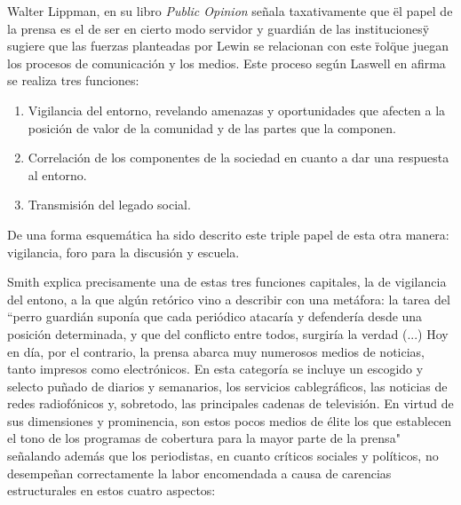
Walter Lippman, en su libro \emph{Public Opinion} \cite{lippmann1922public} señala taxativamente que \"el papel de la prensa es el de ser en cierto modo servidor y guardián de las instituciones\" y sugiere que las fuerzas planteadas por Lewin se relacionan con este \"rol\" que juegan los procesos de comunicación y los medios. Este proceso según Laswell en \cite{Lasswell2007Structure} afirma se realiza tres funciones: 
\begin{enumerate}
\item Vigilancia del entorno, revelando amenazas y oportunidades que afecten a la posición de valor de la comunidad y de las partes que la componen.
\item Correlación de los componentes de la sociedad en cuanto a dar una respuesta al entorno. 
\item Transmisión del legado social. 
\end{enumerate}
De una forma esquemática ha sido descrito este triple papel de esta otra manera: vigilancia, foro para la discusión y escuela.\cite{informacionsociedad} 

Smith \cite{tedsmith} explica precisamente una de estas tres funciones capitales, la de vigilancia del entono, a la que algún retórico vino a describir con una metáfora: la tarea del ``perro guardián suponía que cada periódico atacaría y defendería desde una posición determinada, y que del conflicto entre todos, surgiría la verdad (...) Hoy en día, por el contrario, la prensa abarca muy numerosos medios de noticias, tanto impresos como electrónicos. En esta categoría se incluye un escogido y selecto puñado de diarios y semanarios, los servicios cablegráficos, las noticias de redes radiofónicos y, sobretodo, las principales cadenas de televisión. En virtud de sus dimensiones y prominencia, son estos pocos medios de élite los que establecen el tono de los programas de cobertura para la mayor parte de la prensa" señalando además que los periodistas, en cuanto críticos sociales y políticos, no desempeñan correctamente la labor encomendada a causa de carencias estructurales en estos cuatro aspectos: 

